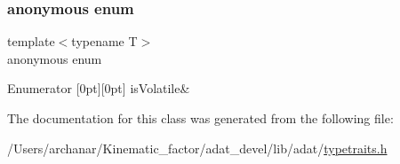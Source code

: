 \subsubsection{\texorpdfstring{anonymous enum}{anonymous enum}}
{\footnotesize\ttfamily template$<$typename T$>$ \\
anonymous enum}

\begin{DoxyEnumFields}{Enumerator}
[0pt][0pt]{}\mbox{\label{classUtil_1_1TypeTraits_ab61557d85a3434ad5979526955075371ad832c3ecd956e173f499202b8a249453}} 
is\+Volatile&\\
\hline

\end{DoxyEnumFields}


The documentation for this class was generated from the following file\+:\begin{DoxyCompactItemize}
\item 
/\+Users/archanar/\+Kinematic\+\_\+factor/adat\+\_\+devel/lib/adat/\mbox{\hyperlink{lib_2adat_2typetraits_8h}{typetraits.\+h}}\end{DoxyCompactItemize}
